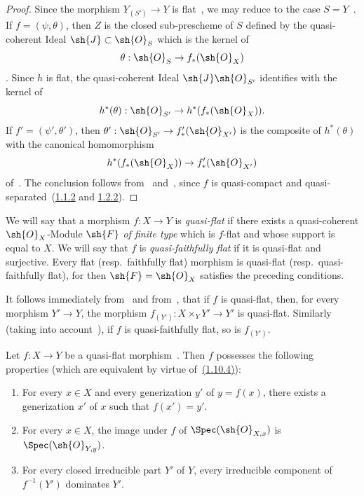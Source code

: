 \begin{proof}
Since the morphism $Y_{(S')}\to Y$ is flat~, we may reduce to the case $S=Y$~.
If $f=(\psi,\theta)$, then $Z$ is the closed sub-prescheme of $S$ defined by the quasi-coherent Ideal $\sh{J}\subset\sh{O}_S$ which is the kernel of
\[
  \theta:\sh{O}_S\to f_*(\sh{O}_X)
\]
.
Since $h$ is flat, the quasi-coherent Ideal $\sh{J}\sh{O}_{S'}$ identifies with the kernel of
\[
  h^*(\theta):\sh{O}_{S'}\to h^*(f_*(\sh{O}_X)).
\]
If $f'=(\psi',\theta')$, then $\theta':\sh{O}_{S'}\to f'_*(\sh{O}_{X'})$ is the composite of $h^*(\theta)$ with the canonical homomorphism
\[
  h^*(f_*(\sh{O}_X))\to f'_*(\sh{O}_{X'})
\]
of~.
The conclusion follows from~ and~, since $f$ is quasi-compact and quasi-separated~({\hyperlink{ega4.c04.prop.1-1-2}{1.1.2}} and {\hyperlink{ega4.c04.prop.1-2-2}{1.2.2}}).
\end{proof}

\begin{env}[2.3.3]
\label{IV.2.3.3}
We will say that a morphism $f:X\to Y$ is \emph{quasi-flat} if there exists a quasi-coherent $\sh{O}_X$-Module $\sh{F}$ \emph{of finite type} which is $f$-flat and whose support is equal to $X$.
We will say that $f$ is \emph{quasi-faithfully flat} if it is quasi-flat and surjective.
Every flat (resp.\ faithfully flat) morphism is quasi-flat (resp.\ quasi-faithfully flat), for then $\sh{F}=\sh{O}_X$ satisfies the preceding conditions.
\end{env}

It follows immediately from~ and from~, that if $f$ is quasi-flat, then, for every morphism $Y'\to Y$, the morphism $f_{(Y')}:X\times_Y Y'\to Y'$ is quasi-flat.
Similarly (taking into account~), if $f$ is quasi-faithfully flat, so is $f_{(Y')}$.

\begin{proposition}[2.3.4]
\label{IV.2.3.4}
Let $f:X\to Y$ be a quasi-flat morphism~. Then $f$ possesses the following properties \textnormal{(}which are equivalent by virtue of~{\hyperlink{ega4.c04.cor.1-10-4}{(1.10.4)}}\textnormal{)}:
\begin{enumerate}
  \item[(i)] For every $x\in X$ and every generization $y'$ of $y=f(x)$, there exists a generization $x'$ of $x$ such that $f(x')=y'$.
  \item[(ii)] For every $x\in X$, the image under $f$ of $\Spec(\sh{O}_{X,x})$ is $\Spec(\sh{O}_{Y,y})$.
  \item[\emph{(iii)}] For every closed irreducible part $Y'$ of $Y$, every irreducible component of $f^{-1}(Y')$ dominates $Y'$.
\end{enumerate}
\end{proposition}

